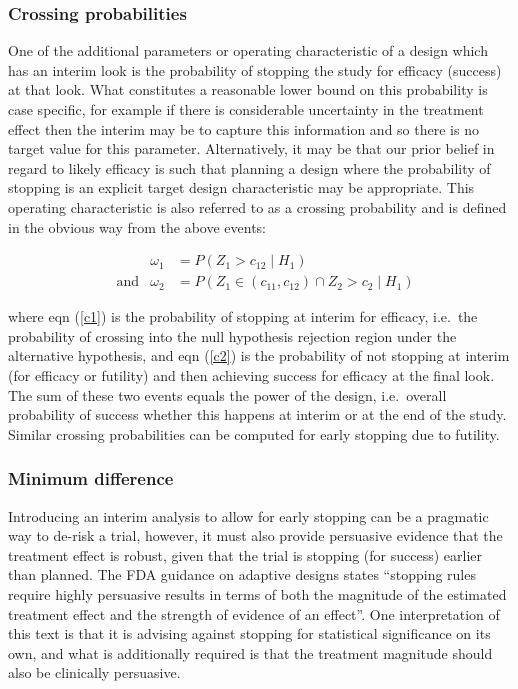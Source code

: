 \documentclass{article}
\begin{document}
 
\subsubsection{Crossing probabilities}\label{stopping}
One of the additional parameters or operating characteristic of a design which has an interim look is the probability of stopping the study for efficacy (success) at that look. What constitutes a reasonable lower bound on this probability is case specific, for example if there is considerable uncertainty in the treatment effect then the interim may be to capture this information and so there is no target value for this parameter. Alternatively, it may be that our prior belief in regard to likely efficacy is such that planning a design where the probability of stopping is an explicit target design characteristic may be appropriate. This operating characteristic is also referred to as a crossing probability and is defined in the obvious way from the above events:
 \begin{fleqn}
\begin{align}
&&\omega_1&=P(Z_{1}>c_{12}\mid{H_1})\label{c1}\\
&\text{and}&\omega_2&=P(Z_{1}\in(c_{11},c_{12}) \cap Z_{2}>c_{2}\mid{H_1})\label{c2}
\end{align}
\end{fleqn}
where eqn (\ref{c1}) is the probability of stopping at interim for efficacy, i.e.~the probability of crossing into the null hypothesis rejection region under the alternative hypothesis, and eqn (\ref{c2}) is the probability of not stopping at interim (for efficacy or futility) and then achieving success for efficacy at the final look. The sum of these two events equals the power of the design, i.e.~overall probability of success whether this happens at interim or at the end of the study. Similar crossing probabilities can be computed for early stopping due to futility.

\subsubsection{Minimum difference}
Introducing an interim analysis to allow for early stopping can be a pragmatic way to de-risk a trial, however, it must also provide persuasive evidence that the treatment effect is robust, given that the trial is stopping (for success) earlier than planned. The FDA guidance on adaptive designs \citep{FDA_guidance} states ``stopping rules require highly persuasive results in terms of both the magnitude of the estimated treatment effect and the strength of evidence of an effect''. One interpretation of this text is that it is advising against stopping for statistical significance on its own, and what is additionally required is that the treatment magnitude should also be clinically persuasive. 
\end{document}
